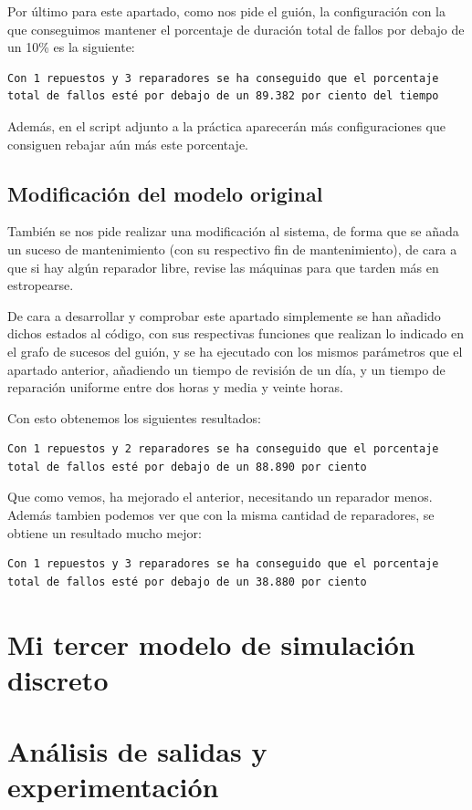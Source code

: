 \documentclass[12pt, spanish]{article}
\begin{document}
Por último para este apartado, como nos pide el guión, la configuración con la que conseguimos mantener el porcentaje de duración total de fallos por debajo de un 10\% es la siguiente:

\begin{lstlisting}
Con 1 repuestos y 3 reparadores se ha conseguido que el porcentaje total de fallos esté por debajo de un 89.382 por ciento del tiempo
\end{lstlisting}

Además, en el script adjunto a la práctica aparecerán más configuraciones que consiguen rebajar aún más este porcentaje.

\subsection{Modificación del modelo original}

También se nos pide realizar una modificación al sistema, de forma que se añada un suceso de mantenimiento (con su respectivo fin de mantenimiento), de cara a que si hay algún reparador libre, revise las máquinas para que tarden más en estropearse.

De cara a desarrollar y comprobar este apartado simplemente se han añadido dichos estados al código, con sus respectivas funciones que realizan lo indicado en el grafo de sucesos del guión, y se ha ejecutado con los mismos parámetros que el apartado anterior, añadiendo un tiempo de revisión de un día, y un tiempo de reparación uniforme entre dos horas y media y veinte horas.

Con esto obtenemos los siguientes resultados:

\begin{lstlisting}
Con 1 repuestos y 2 reparadores se ha conseguido que el porcentaje total de fallos esté por debajo de un 88.890 por ciento
\end{lstlisting}

Que como vemos, ha mejorado el anterior, necesitando un reparador menos. Además tambien podemos ver que con la misma cantidad de reparadores, se obtiene un resultado mucho mejor:

\begin{lstlisting}
Con 1 repuestos y 3 reparadores se ha conseguido que el porcentaje total de fallos esté por debajo de un 38.880 por ciento
\end{lstlisting}



\section{Mi tercer modelo de simulación discreto}

\section{Análisis de salidas y experimentación}

%
%
\end{document}
